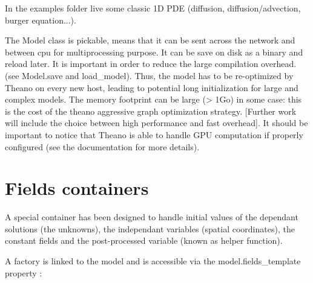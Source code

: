 \documentclass[letterpaper,10pt,english]{sphinxmanual}
\begin{document}
In the examples folder live some classic 1D PDE (diffusion, diffusion/advection, burger equation...).

The Model class is pickable, means that it can be sent across the network and between cpu for multiprocessing purpose. It can be save on disk as a binary and reload later. It is important in order to reduce the large compilation overhead. (see Model.save and load\_model). Thus, the model has to be re-optimized by Theano on every new host, leading to potential long initialization for large and complex models. The memory footprint can be large (\textgreater{} 1Go) in some case: this is the cost of the theano aggressive graph optimization strategy. {[}Further work will include the choice between high performance and fast overhead{]}. It should be important to notice that Theano is able to handle GPU computation if properly configured (see the  documentation for more details).


\section{Fields containers}
\label{\detokenize{overview:fields-containers}}
A special container has been designed to handle initial values of the dependant solutions (the unknowns), the independant variables (spatial coordinates), the constant fields and the post-processed variable (known as helper function).

A factory is linked to the model and is accessible via the model.fields\_template property :

\begin{sphinxVerbatim}[commandchars=\\\{\}]
   
   

  
              \PYG{p}{[} \PYG{p}{]}

      
        
   
\end{sphinxVerbatim}
\end{document}
